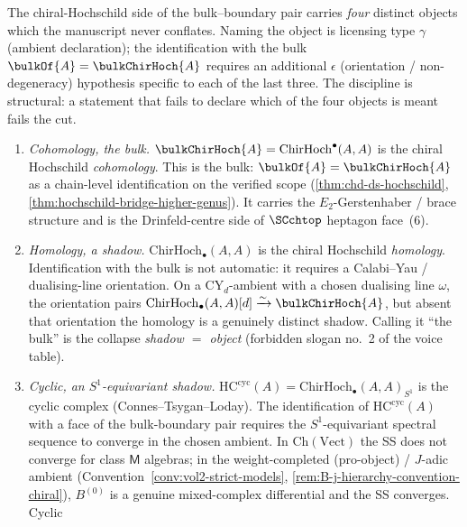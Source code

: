 \begin{remark}
\label{rem:cyclic-hochschild-four-objects}
%
%
The chiral-Hochschild side of the bulk--boundary pair carries
\emph{four} distinct objects which the manuscript never
conflates. Naming the object is licensing type $\gamma$ (ambient
declaration); the identification with the bulk
$\bulkOf{A} = \bulkChirHoch{A}$ requires an additional $\epsilon$
(orientation / non-degeneracy) hypothesis specific to each of the
last three. The discipline is structural: a statement that fails
to declare which of the four objects is meant fails the cut.
\begin{enumerate}[label=\textup{(\roman*)}]
\item \emph{Cohomology, the bulk.}
$\bulkChirHoch{A} = \mathrm{ChirHoch}^{\bullet}(A, A)$ is the
chiral Hochschild \emph{cohomology}. This is the bulk:
$\bulkOf{A} = \bulkChirHoch{A}$ as a chain-level identification
on the verified scope (\cref{thm:chd-ds-hochschild},
\cref{thm:hochschild-bridge-higher-genus}). It carries the
$E_2$-Gerstenhaber / brace structure and is the Drinfeld-centre
side of $\SCchtop$ heptagon face~(6).
\item \emph{Homology, a shadow.}
$\mathrm{ChirHoch}_{\bullet}(A, A)$ is the chiral Hochschild
\emph{homology}. Identification with the bulk is not automatic:
it requires a Calabi--Yau / dualising-line orientation. On a
$\mathrm{CY}_d$-ambient with a chosen dualising line $\omega$,
the orientation pairs
$\mathrm{ChirHoch}_{\bullet}(A, A)[d] \xrightarrow{\sim}
\bulkChirHoch{A}$, but absent that orientation the homology is a
genuinely distinct shadow. Calling it ``the bulk'' is the
collapse \emph{shadow $=$ object} (forbidden slogan no.~2 of the
voice table).
\item \emph{Cyclic, an $S^1$-equivariant shadow.}
$\mathrm{HC}^{\mathrm{cyc}}(A) = \mathrm{ChirHoch}_{\bullet}(A,
A)_{S^1}$ is the cyclic complex (Connes--Tsygan--Loday). The
identification of $\mathrm{HC}^{\mathrm{cyc}}(A)$ with a face of
the bulk-boundary pair requires the $S^1$-equivariant spectral
sequence to converge in the chosen ambient. In
$\mathrm{Ch}(\mathrm{Vect})$ the SS does not converge for class
$\mathsf M$ algebras; in the weight-completed (pro-object) /
$J$-adic ambient (Convention~\ref{conv:vol2-strict-models},
\cref{rem:B-j-hierarchy-convention-chiral}), $B^{(0)}$ is a
genuine mixed-complex differential and the SS converges. Cyclic

\end{enumerate}
\end{remark}
